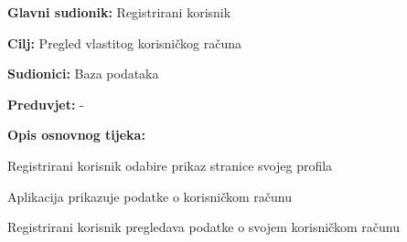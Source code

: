 				
				\noindent {}
				\begin{packed_item}
					
					\item \textbf{Glavni sudionik:} Registrirani korisnik
					\item  \textbf{Cilj:} Pregled vlastitog korisničkog računa
					\item  \textbf{Sudionici:} Baza podataka
					\item  \textbf{Preduvjet:} -
					
					\item  \textbf{Opis osnovnog tijeka:}
					\item[] \begin{packed_enum}
						\item Registrirani korisnik odabire prikaz stranice svojeg profila
						\item Aplikacija prikazuje podatke o korisničkom računu
						\item Registrirani korisnik pregledava podatke o svojem korisničkom računu
					\end{packed_enum}
				\end{packed_item}
				
